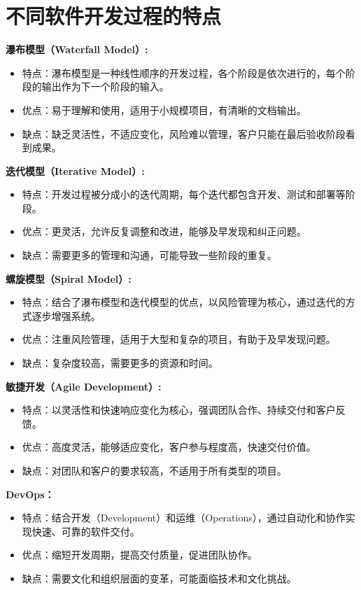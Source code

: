 \documentclass[11pt, a4paper, oneside]{ctexbook}
\begin{document}
\section{不同软件开发过程的特点}

\textbf{瀑布模型（Waterfall Model）:}
\begin{itemize}
    \item 特点：瀑布模型是一种线性顺序的开发过程，各个阶段是依次进行的，每个阶段的输出作为下一个阶段的输入。
    \item 优点：易于理解和使用，适用于小规模项目，有清晰的文档输出。
    \item 缺点：缺乏灵活性，不适应变化，风险难以管理，客户只能在最后验收阶段看到成果。
\end{itemize}

\textbf{迭代模型（Iterative Model）:}
\begin{itemize}
    \item 特点：开发过程被分成小的迭代周期，每个迭代都包含开发、测试和部署等阶段。
    \item 优点：更灵活，允许反复调整和改进，能够及早发现和纠正问题。
    \item 缺点：需要更多的管理和沟通，可能导致一些阶段的重复。
\end{itemize}

\textbf{螺旋模型（Spiral Model）:}
\begin{itemize}
    \item 特点：结合了瀑布模型和迭代模型的优点，以风险管理为核心，通过迭代的方式逐步增强系统。
    \item 优点：注重风险管理，适用于大型和复杂的项目，有助于及早发现问题。
    \item 缺点：复杂度较高，需要更多的资源和时间。
\end{itemize}

\textbf{敏捷开发（Agile Development）:}
\begin{itemize}
    \item 特点：以灵活性和快速响应变化为核心，强调团队合作、持续交付和客户反馈。
    \item 优点：高度灵活，能够适应变化，客户参与程度高，快速交付价值。
    \item 缺点：对团队和客户的要求较高，不适用于所有类型的项目。
\end{itemize}
\textbf{DevOps：}
\begin{itemize}
    \item 特点：结合开发（Development）和运维（Operations），通过自动化和协作实现快速、可靠的软件交付。
    \item 优点：缩短开发周期，提高交付质量，促进团队协作。
    \item 缺点：需要文化和组织层面的变革，可能面临技术和文化挑战。
\end{itemize}
\end{document}

